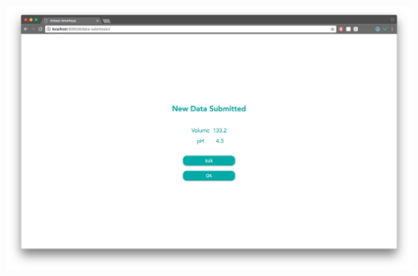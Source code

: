\documentclass[draftclsnofoot,onecolumn,letterpaper,10pt,compsoc]{IEEEtran}
\begin{document}
\centerline{\includegraphics[height=10cm]{screenshots/desktop/data_submission.png}}
\end{document}
